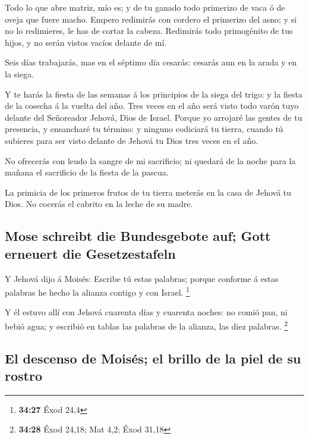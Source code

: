  Todo lo que abre matriz, mío es; y de tu ganado todo
primerizo de vaca ó de oveja que fuere macho.  Empero
redimirás con cordero el primerizo del asno; y si no lo redimieres, le
has de cortar la cabeza. Redimirás todo primogénito de tus hijos, y no
serán vistos vacíos delante de mí.

 Seis días trabajarás, mas en el séptimo día cesarás:
cesarás aun en la arada y en la siega.

 Y te harás la fiesta de las semanas á los principios de la
siega del trigo: y la fiesta de la cosecha á la vuelta del año.
 Tres veces en el año será visto todo varón tuyo delante
del Señoreador Jehová, Dios de Israel.  Porque yo arrojaré
las gentes de tu presencia, y ensancharé tu término: y ninguno codiciará
tu tierra, cuando tú subieres para ser visto delante de Jehová tu Dios
tres veces en el año.

 No ofrecerás con leudo la sangre de mi sacrificio; ni
quedará de la noche para la mañana el sacrificio de la fiesta de la
pascua.

 La primicia de los primeros frutos de tu tierra meterás en
la casa de Jehová tu Dios. No cocerás el cabrito en la leche de su
madre.

\hypertarget{mose-schreibt-die-bundesgebote-auf-gott-erneuert-die-gesetzestafeln}{%
\subsection{Mose schreibt die Bundesgebote auf; Gott erneuert die
Gesetzestafeln}\label{mose-schreibt-die-bundesgebote-auf-gott-erneuert-die-gesetzestafeln}}

 Y Jehová dijo á Moisés: Escribe tú estas palabras; porque
conforme á estas palabras he hecho la alianza contigo y con Israel.
\footnote{\textbf{34:27} Éxod 24,4}

 Y él estuvo allí con Jehová cuarenta días y cuarenta
noches: no comió pan, ni bebió agua; y escribió en tablas las palabras
de la alianza, las diez palabras. \footnote{\textbf{34:28} Éxod 24,18;
  Mat 4,2; Éxod 31,18}

\hypertarget{el-descenso-de-moisuxe9s-el-brillo-de-la-piel-de-su-rostro}{%
\subsection{El descenso de Moisés; el brillo de la piel de su
rostro}\label{el-descenso-de-moisuxe9s-el-brillo-de-la-piel-de-su-rostro}}

